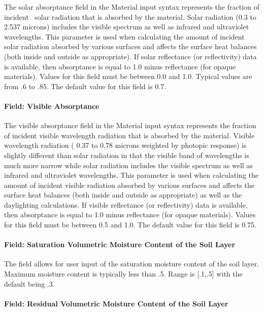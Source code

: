 The solar absorptance field in the Material input syntax represents the fraction of incident~ solar radiation that is absorbed by the material. Solar radiation (0.3 to 2.537 microns) includes the visible spectrum as well as infrared and ultraviolet wavelengths. This parameter is used when calculating the amount of incident solar radiation absorbed by various surfaces and affects the surface heat balances (both inside and outside as appropriate). If solar reflectance (or reflectivity) data is available, then absorptance is equal to 1.0 minus reflectance (for opaque materials). Values for this field must be between 0.0 and 1.0. Typical values are from .6 to .85. The default value for this field is 0.7.

\paragraph{Field: Visible Absorptance}\label{field-visible-absorptance-2}

The visible absorptance field in the Material input syntax represents the fraction of incident visible wavelength radiation that is absorbed by the material. Visible wavelength radiation ( 0.37 to 0.78 microns weighted by photopic response) is slightly different than solar radiation in that the visible band of wavelengths is much more narrow while solar radiation includes the visible spectrum as well as infrared and ultraviolet wavelengths. This parameter is used when calculating the amount of incident visible radiation absorbed by various surfaces and affects the surface heat balances (both inside and outside as appropriate) as well as the daylighting calculations. If visible reflectance (or reflectivity) data is available, then absorptance is equal to 1.0 minus reflectance (for opaque materials). Values for this field must be between 0.5 and 1.0. The default value for this field is 0.75.

\paragraph{Field: Saturation Volumetric Moisture Content of the Soil Layer}\label{field-saturation-volumetric-moisture-content-of-the-soil-layer}

The field allows for user input of the saturation moisture content of the soil layer. Maximum moisture content is typically less than .5. Range is {[}.1,.5{]} with the default being .3.

\paragraph{Field: Residual Volumetric Moisture Content of the Soil Layer}\label{field-residual-volumetric-moisture-content-of-the-soil-layer}

